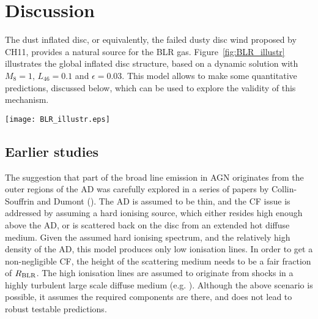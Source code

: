 \documentclass[a4paper,fleqn,usenatbib]{mnras}
\begin{document}
\section{Discussion} \label{sec:discussion}

The dust inflated disc, or equivalently, the failed dusty disc wind proposed by CH11, 
provides a natural source for the BLR gas. 
Figure~\ref{fig:BLR_illustr} illustrates the global inflated disc structure, based on a dynamic solution with $M_8=1$, $L_{46}=0.1$ and $\epsilon=0.03$. This model allows to make some quantitative predictions, 
discussed below, which can be used to explore the validity of this mechanism.


\begin{figure*}
\texttt{[image: BLR\_illustr.eps]}		
\caption{A side view of the dynamic solution disc profile, for $M_8=1$, $L_{46}=0.1$ and
$\epsilon =0.03$. The AD is inflated due to the dust opacity, leading to
a torus structure. The illuminated face is composed of dustless gas, and is a natural origin for 
the observed BLR emission. In the dusty BLR region, only large grains avoid sublimation, and given the reduced
dust opacity in the UV, this region will produce both unreddened line emission and IR emission. 
The back side of the torus is dusty and produces mostly hot dust emission.
The dynamics due to the illuminating optical-UV from the central source is not included.
This radiation pressure will likely drive a tangential sheared wind off the surface photoionized layer,
which will increase the CF of the BLR gas.}
\label{fig:BLR_illustr}
\end{figure*}



\subsection{Earlier studies}

The suggestion that part of the broad line emission in AGN originates from the outer regions of the AD
was carefully explored in a series of papers by Collin-Souffrin and Dumont 
(\citealt{Collin87, Collin90, DC90a, DC90b, DC90c}). The AD is assumed to be thin, and the 
CF issue is addressed by assuming a hard
ionising source, which either resides high enough above the AD, or is scattered back on the disc from
an extended hot diffuse medium. Given the assumed hard ionising spectrum, and the relatively high density 
of the AD, this model produces only low ionisation lines. In order to get a non-negligible CF, the
height of the scattering medium needs to be a fair fraction of $R_{\rm BLR}$.
The high ionisation lines are assumed
to originate from shocks in a highly turbulent large scale diffuse medium (e.g. \citealt{Collin88}).
Although the above scenario is possible, it assumes the required components are there, and does not 
lead to robust testable predictions.
\end{document}
